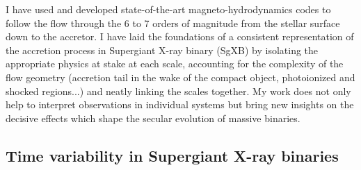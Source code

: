 \documentclass[letterpaper,12pt,onecolumn]{article}
\makeatletter
\newcommand{\sgx}{SgXB\xspace}
\newcommand*{\hmxb}{HMXB\@\xspace}
\makeatother
\begin{document}
I have used and developed state-of-the-art magneto-hydrodynamics codes to follow the flow through the 6 to 7 orders of magnitude from the stellar surface down to the accretor. I have laid the foundations of a consistent representation of the accretion process in Supergiant X-ray binary (\sgx) by isolating the appropriate physics at stake at each scale, accounting for the complexity of the flow geometry (accretion tail in the wake of the compact object, photoionized and shocked regions...) and neatly linking the scales together. My work does not only help to interpret observations in individual systems but bring new insights on the decisive effects which shape the secular evolution of massive binaries.


\subsection*{Time variability in Supergiant X-ray binaries}


\normalsize

\end{document}
